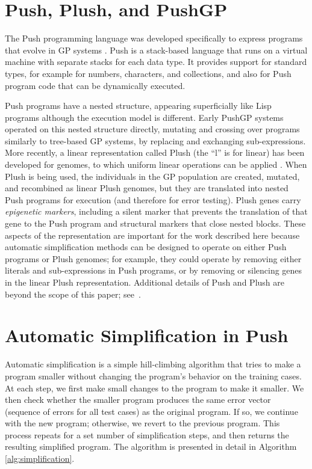 \section{Push, Plush, and PushGP}
\label{sec:push}

The Push programming language was developed specifically to express programs that evolve in GP systems \cite{spector2:2001:gecco, spector:2002:GPEM, 1068292}. Push is a stack-based language that runs on a virtual machine with separate stacks for each data type. It provides support for standard types, for example for numbers, characters, and collections, and also for Push program code that can be dynamically executed. 

Push programs have a nested structure, appearing superficially like Lisp programs although the execution model is different. Early PushGP systems operated on this nested structure directly, mutating and crossing over programs similarly to tree-based GP systems, by replacing and exchanging sub-expressions. More recently, a linear representation called Plush (the ``l'' is for linear) has been developed for genomes, to which uniform linear operations can be applied \cite{Helmuth:2016:GPTP}. When Plush is being used, the individuals in the GP population are created, mutated, and recombined as linear Plush genomes, but they are translated into nested Push programs for execution (and therefore for error testing). Plush genes carry {\it epigenetic markers}, including a {\ttfamily silent} marker that prevents the translation of that gene to the Push program \cite{LaCava:2014:GPTP} and structural markers that close nested blocks. These aspects of the representation are important for the work described here because automatic simplification methods can be designed to operate on either Push programs or Plush genomes; for example, they could operate by removing either literals and sub-expressions in Push programs, or by removing or silencing genes in the linear Plush representation.
Additional details of Push and Plush are beyond the scope of this paper; see~\cite{Helmuth:2016:GPTP}.


\section{Automatic Simplification in Push}
\label{sec:simplification}

Automatic simplification is a simple hill-climbing algorithm that tries to make a program smaller without changing the program's behavior on the training cases. At each step, we first make small changes to the program to make it smaller. We then check whether the smaller program produces the same error vector (sequence of errors for all test cases) as the original program. If so, we continue with the new program; 
otherwise, we revert to the previous program. This process repeats for a set 
number of simplification steps, and then returns the resulting simplified program. The algorithm is presented in detail in Algorithm \ref{alg:simplification}.

